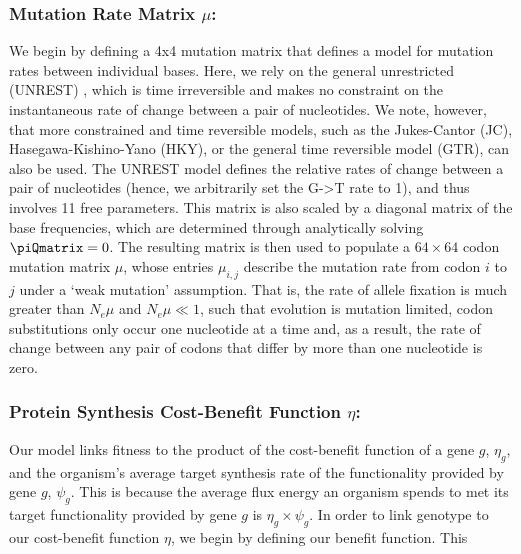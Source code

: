 \documentclass{article}
\newcommand{\Nemu}{\ensuremath{{N_e \mu}}\xspace} %
\newcommand{\etag}{\ensuremath{\eta_g}\xspace}
\newcommand{\muij}{\ensuremath{\mu_{i,j}}\xspace}
\newcommand{\psig}{\ensuremath{\psi_{g}}\xspace}
\begin{document}
\subsubsection*{Mutation Rate Matrix $\mu$: }
We begin by defining a 4x4 mutation matrix that defines a model for mutation rates between individual bases.
Here, we rely on the general unrestricted (UNREST) \citep{Yang1994}, which is time irreversible and makes no constraint on the instantaneous rate of change between a pair of nucleotides. 
We note, however, that more constrained and time reversible models, such as the Jukes-Cantor (JC), Hasegawa-Kishino-Yano (HKY), or the general time reversible model (GTR), can also be used.
The UNREST model defines the relative rates of change between a pair of nucleotides (hence, we arbitrarily set the G->T rate to 1), and thus involves 11 free parameters.
This matrix is also scaled by a diagonal matrix of the base frequencies, which are determined through analytically solving $\piQmatrix = 0$.
The resulting matrix is then used to populate a $64 \times 64$ codon mutation matrix $\mu$, whose entries $\muij$ describe the mutation rate from codon $i$ to $j$ under a `weak mutation' assumption.
That is, the rate of allele fixation is much greater than \Nemu and $\Nemu \ll 1$, such that evolution is mutation limited, codon substitutions only occur one nucleotide at a time and, as a result, the rate of change between any pair of codons that differ by more than one nucleotide is zero.


\subsubsection*{Protein Synthesis Cost-Benefit Function $\eta$: }
Our model links fitness to the product of the cost-benefit function of a gene $g$, $\etag$, and the organism's average target synthesis rate of the functionality provided by gene $g$, $\psig$.
This is because the average flux energy an organism spends to met its target functionality provided by gene $g$ is $\etag \times \psig$.
In order to link genotype to our cost-benefit function $\eta$, we begin by defining our benefit function.
This
\end{document}
